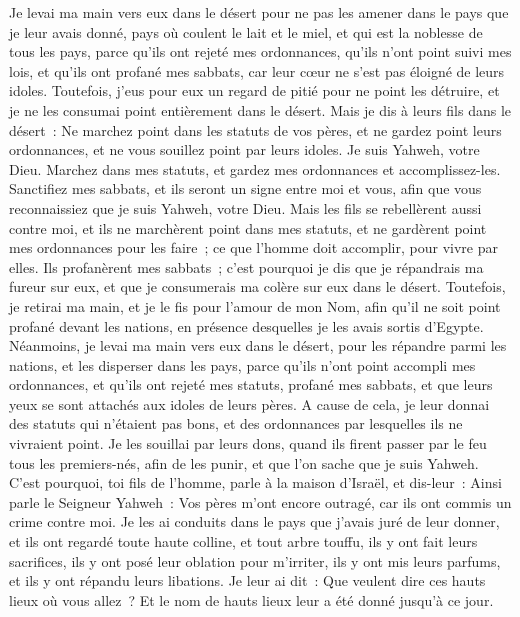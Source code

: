 \begin{multicols}{2}
Je levai ma main vers eux dans le désert pour ne pas les amener dans le pays que je leur avais donné, pays où coulent le lait et le miel, et qui est la noblesse de tous les pays,
parce qu'ils ont rejeté mes ordonnances, qu'ils n'ont point suivi mes lois, et qu'ils ont profané mes sabbats, car leur cœur ne s'est pas éloigné de leurs idoles.
Toutefois, j'eus pour eux un regard de pitié pour ne point les détruire, et je ne les consumai point entièrement dans le désert.
Mais je dis à leurs fils dans le désert~: Ne marchez point dans les statuts de vos pères, et ne gardez point leurs ordonnances, et ne vous souillez point par leurs idoles.
Je suis Yahweh, votre Dieu. Marchez dans mes statuts, et gardez mes ordonnances et accomplissez-les.
Sanctifiez mes sabbats, et ils seront un signe entre moi et vous, afin que vous reconnaissiez que je suis Yahweh, votre Dieu.
Mais les fils se rebellèrent aussi contre moi, et ils ne marchèrent point dans mes statuts, et ne gardèrent point mes ordonnances pour les faire~; ce que l'homme doit accomplir, pour vivre par elles. Ils profanèrent mes sabbats~; c'est pourquoi je dis que je répandrais ma fureur sur eux, et que je consumerais ma colère sur eux dans le désert.
Toutefois, je retirai ma main, et je le fis pour l'amour de mon Nom, afin qu'il ne soit point profané devant les nations, en présence desquelles je les avais sortis d'Egypte.
Néanmoins, je levai ma main vers eux dans le désert, pour les répandre parmi les nations, et les disperser dans les pays,
parce qu'ils n'ont point accompli mes ordonnances, et qu'ils ont rejeté mes statuts, profané mes sabbats, et que leurs yeux se sont attachés aux idoles de leurs pères.
A cause de cela, je leur donnai des statuts qui n'étaient pas bons, et des ordonnances par lesquelles ils ne vivraient point.
Je les souillai par leurs dons, quand ils firent passer par le feu tous les premiers-nés, afin de les punir, et que l'on sache que je suis Yahweh.
C'est pourquoi, toi fils de l'homme, parle à la maison d'Israël, et dis-leur~: Ainsi parle le Seigneur Yahweh~: Vos pères m'ont encore outragé, car ils ont commis un crime contre moi.
Je les ai conduits dans le pays que j'avais juré de leur donner, et ils ont regardé toute haute colline, et tout arbre touffu, ils y ont fait leurs sacrifices, ils y ont posé leur oblation pour m'irriter, ils y ont mis leurs parfums, et ils y ont répandu leurs libations.
Je leur ai dit~: Que veulent dire ces hauts lieux où vous allez~? Et le nom de hauts lieux leur a été donné jusqu'à ce jour.

\end{multicols}
